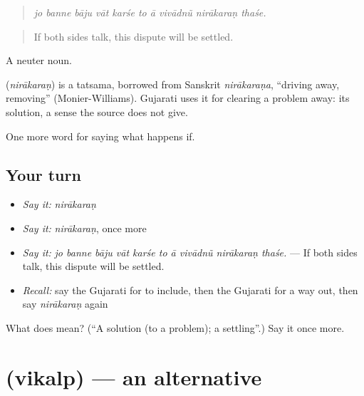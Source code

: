 \begin{quote}
\emph{jo banne bāju vāt karśe to ā vivādnũ nirākaraṇ thaśe.}
\end{quote}

\begin{quote}
If both sides talk, this dispute will be settled.
\end{quote}

A neuter noun.

\begin{cousinweb}
\textbf{} (\emph{nirākaraṇ}) is a tatsama, borrowed from Sanskrit \emph{nirākaraṇa}, \textquotedblleft{}driving away, removing\textquotedblright{} (Monier-Williams). Gujarati uses it for clearing a problem away: its solution, a sense the source does not give.
\end{cousinweb}

\begin{grammarlens}[title={What you've built}]
One more word for saying what happens if.
\end{grammarlens}

\subsection*{Your turn}
\begin{itemize}
\raggedright
  \item \emph{Say it:} \emph{nirākaraṇ}
  \item \emph{Say it:} \emph{nirākaraṇ}, once more
  \item \emph{Say it:} \emph{jo banne bāju vāt karśe to ā vivādnũ nirākaraṇ thaśe.} — If both sides talk, this dispute will be settled.
  \item \emph{Recall:} say the Gujarati for to include, then the Gujarati for a way out, then say \emph{nirākaraṇ} again
\end{itemize}

\begin{tcolorbox}[breakable,colback=teal!4,colframe=teal!35!black,title={Before you move on}]
What does  mean? (\textquotedblleft{}A solution (to a problem); a settling\textquotedblright{}.) Say it once more.
\end{tcolorbox}
\section[\texorpdfstring{\gu{વિકલ્પ} (vikalp)}{વિકલ્પ (vikalp)}]{ (vikalp) — an alternative}

\label{lesson:GU-C373-vikalp}




